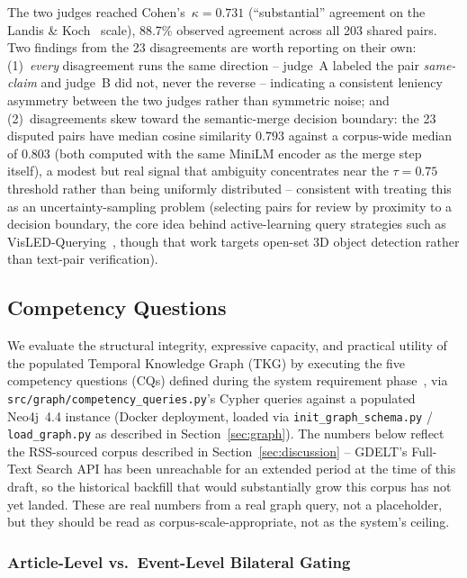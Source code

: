 \documentclass[conference]{IEEEtran}
\begin{document}
The two judges reached Cohen's~$\kappa=0.731$ (``substantial'' agreement
on the Landis \& Koch~\cite{landiskoch1977kappa} scale), 88.7\% observed
agreement across all 203 shared pairs. Two findings from the 23
disagreements are worth reporting on their own: (1)~\emph{every}
disagreement runs the same direction -- judge~A labeled the pair
\emph{same-claim} and judge~B did not, never the reverse -- indicating a
consistent leniency asymmetry between the two judges rather than
symmetric noise; and (2)~disagreements skew toward the semantic-merge
decision boundary: the 23 disputed pairs have median cosine similarity
$0.793$ against a corpus-wide median of $0.803$ (both computed with the
same MiniLM encoder as the merge step itself), a modest but real signal
that ambiguity concentrates near the $\tau=0.75$ threshold rather than
being uniformly distributed -- consistent with treating this as an
uncertainty-sampling problem (selecting pairs for review by proximity to
a decision boundary, the core idea behind active-learning query
strategies such as VisLED-Querying~\cite{ross2024visled}, though that work
targets open-set 3D object detection rather than text-pair verification).

\subsection{Competency Questions}
\label{sec:cq}

We evaluate the structural integrity, expressive capacity, and practical
utility of the populated Temporal Knowledge Graph (TKG) by executing the
five competency questions (CQs) defined during the system requirement
phase~\cite{gruninger1995ontology}, via \texttt{src/graph/competency\_queries.py}'s
Cypher queries against a populated Neo4j~4.4 instance (Docker deployment,
loaded via \texttt{init\_graph\_schema.py} / \texttt{load\_graph.py} as
described in Section~\ref{sec:graph}). The numbers below reflect the
RSS-sourced corpus described in Section~\ref{sec:discussion} -- GDELT's
Full-Text Search API has been unreachable for an extended period at the
time of this draft, so the historical backfill that would substantially
grow this corpus has not yet landed. These are real numbers from a real
graph query, not a placeholder, but they should be read as
corpus-scale-appropriate, not as the system's ceiling.

\subsubsection{Article-Level vs.\ Event-Level Bilateral Gating}
\label{sec:cq-method}
\end{document}
